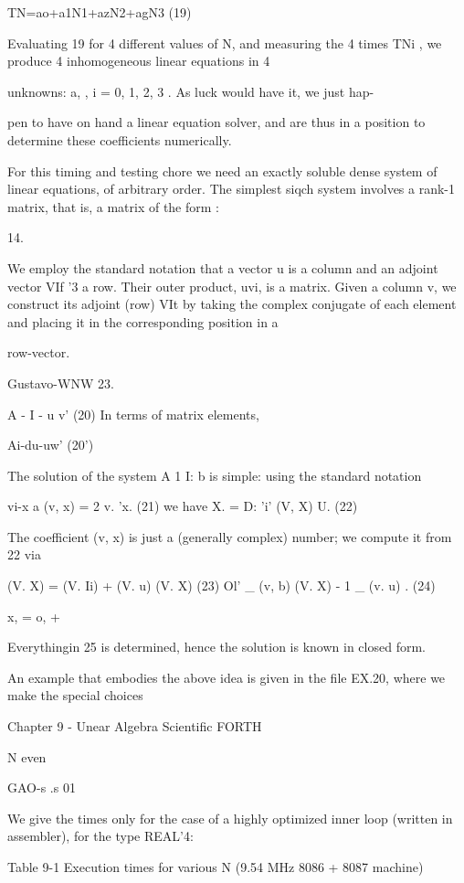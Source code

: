 TN=ao+a1N1+azN2+agN3 (19)

Evaluating 19 for 4 different values of N, and measuring the 4
times TNi , we produce 4 inhomogeneous linear equations in 4

unknowns: a, , i = 0, 1, 2, 3 . As luck would have it, we just hap-

pen to have on hand a linear equation solver, and are thus in a
position to determine these coefficients numerically.

For this timing and testing chore we need an exactly soluble dense
system of linear equations, of arbitrary order. The simplest siqch
system involves a rank-1 matrix, that is, a matrix of the form :

 

14.

We employ the standard notation that a vector u is a column and an adjoint vector VIf '3 a row.
Their outer product, uvi, is a matrix. Given a column v, we construct its adjoint (row) VIt by
taking the complex conjugate of each element and placing it in the corresponding position in a

row-vector.

Gustavo-WNW 23.

A - I - u v' (20)
In terms of matrix elements,

Ai-du-uw' (20')

The solution of the system A 1 I: b is simple: using the standard
notation

vi-x a (v, x) = 2 v. 'x. (21)
we have
X. = D: 'i' (V, X) U. (22)

The coefficient (v, x) is just a (generally complex) number; we
compute it from 22 via

(V. X) = (V. Ii) + (V. u) (V. X) (23)
Ol'
\_ (v, b)
(V. X) - 1 \_ (v. u) . (24)

x, = o, + %

Everythingin 25 is determined, hence the solution is known in
closed form.

An example that embodies the above idea is given in the file
EX.20, where we make the special choices

Chapter 9 - Unear Algebra Scientific FORTH

N even

GAO-s
.s
01

We give the times only for the case of a highly optimized inner
loop (written in assembler), for the type REAL'4:

 

Table 9-1 Execution times for various N (9.54 MHz 8086 + 8087 machine)


